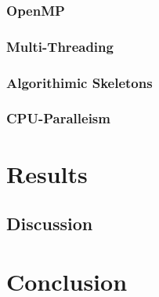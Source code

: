 \documentclass[journal,transmag]{IEEEtran}
\begin{document}
	\subsubsection{OpenMP}
	\subsubsection{Multi-Threading}
	\subsubsection{Algorithimic Skeletons}
	\subsubsection{CPU-Paralleism}

\section{Results}
	\subsection{Discussion}
	
\section{Conclusion}
	

\newpage




\end{document}

